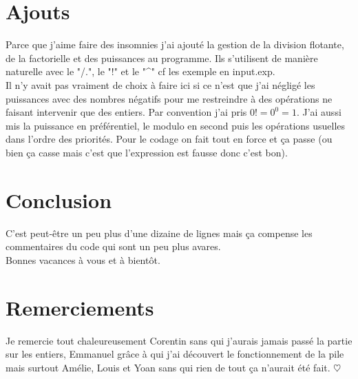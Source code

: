 \documentclass{article}
\begin{document}
\section{Ajouts}
Parce que j'aime faire des insomnies j'ai ajouté la gestion de la division flotante, de la factorielle et des puissances au programme. Ils s'utilisent de manière naturelle avec le "/.", le "!" et le "\^{}" cf les exemple en input.exp. %
\\
Il n'y avait pas vraiment de choix à faire ici si ce n'est que j'ai négligé les puissances avec des nombres négatifs pour me restreindre à des opérations ne faisant intervenir que des entiers. Par convention j'ai pris $0! = 0 ^ 0 = 1$. J'ai aussi mis la puissance en préférentiel, le modulo en second puis les opérations usuelles dans l'ordre des priorités. Pour le codage on fait tout en force et ça passe (ou bien ça casse mais c'est que l'expression est fausse donc c'est bon).\\

\section{Conclusion}
C'est peut-être un peu plus d'une dizaine de lignes mais ça compense les commentaires du code qui sont un peu plus avares.\\
Bonnes vacances à vous et à bientôt.\\

\section{Remerciements}
Je remercie tout chaleureusement Corentin sans qui j'aurais jamais passé la partie sur les entiers, Emmanuel grâce à qui j'ai découvert le fonctionnement de la pile mais surtout Amélie, Louis et Yoan sans qui rien de tout ça n'aurait été fait. $\heartsuit$
\end{document}
